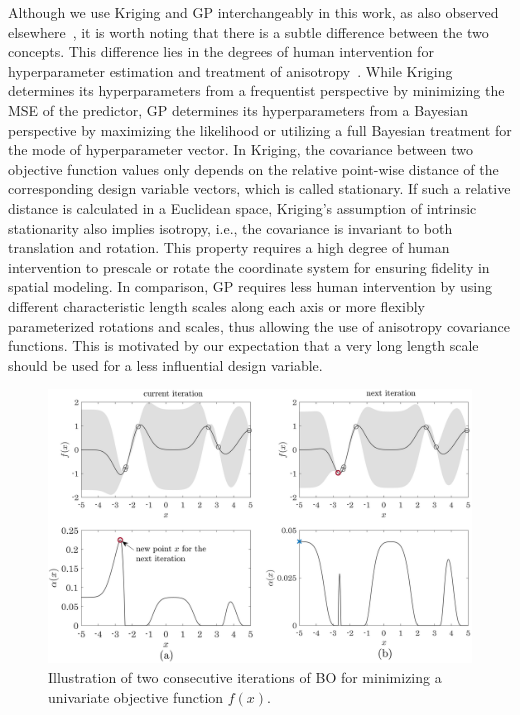 \documentclass[iicol,sn-basic]{sn-jnl}%
\newcommand{\edit}[1]{\textcolor{red}{#1}} %
\begin{document}
Although we use Kriging and GP interchangeably in this work, as also observed elsewhere~\citep[see e.g.,][]{Forrester2008,Erickson2018}, it is worth noting that there is a subtle difference between the two concepts.
This difference lies in the degrees of human intervention for hyperparameter estimation and treatment of anisotropy~\citep{Christianson2023}.
While Kriging determines its hyperparameters from a frequentist perspective by minimizing the MSE of the predictor, GP determines its hyperparameters from a Bayesian perspective by maximizing the likelihood or utilizing a full Bayesian treatment for the mode of hyperparameter vector.
In Kriging, the covariance between two objective function values only depends on the relative point-wise distance of the corresponding design variable vectors, which is called stationary.
If such a relative distance is calculated in a Euclidean space, Kriging's assumption of intrinsic stationarity also implies isotropy, i.e., the covariance is invariant to both translation and rotation.
This property requires a high degree of human intervention to prescale or rotate the coordinate system for ensuring fidelity in spatial modeling.
In comparison, GP requires less human intervention by using different characteristic length scales along each axis or more flexibly parameterized rotations and scales, thus allowing the use of anisotropy covariance functions.
{This is motivated by our expectation that a very long length scale should be used for a less influential design variable.}

\begin{figure}
	\centering
	\includegraphics[scale=0.81]{Fig4.png}
	\caption{ Illustration of two consecutive iterations of BO for minimizing a univariate objective function $f(x)$.}
	\label{Fig4}
\end{figure}
\end{document}
